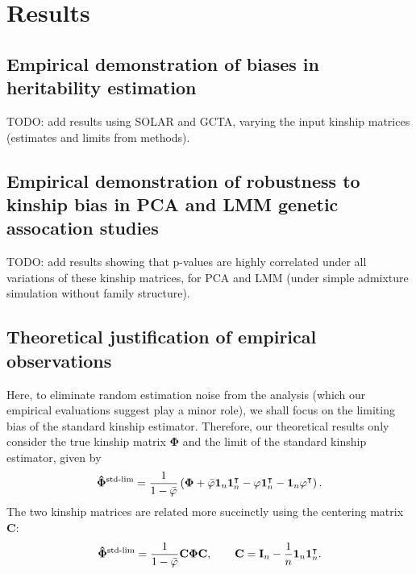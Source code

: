 \documentclass[11pt]{article}
\newcommand{\kinMat}{%
  \ensuremath{%
    \mathbf{\Phi}
  }%
  \xspace%
}%
\newcommand{\kinMatStdLim}{%
  \ensuremath{%
    \mathbf{\hat{\Phi}}^\text{std-lim}
  }%
  \xspace%
}%
\begin{document}
\section{Results}

\subsection{Empirical demonstration of biases in heritability estimation}

TODO: add results using SOLAR and GCTA, varying the input kinship matrices (estimates and limits from methods).

\subsection{Empirical demonstration of robustness to kinship bias in PCA and LMM genetic assocation studies}

TODO: add results showing that p-values are highly correlated under all variations of these kinship matrices, for PCA and LMM (under simple admixture simulation without family structure).

\subsection{Theoretical justification of empirical observations}

Here, to eliminate random estimation noise from the analysis (which our empirical evaluations suggest play a minor role), we shall focus on the limiting bias of the standard kinship estimator.
Therefore, our theoretical results only consider the true kinship matrix \kinMat and the limit of the standard kinship estimator, given by
$$
\kinMatStdLim
=
\frac{1}{1 - \bar{\varphi}}
\left(
  \kinMat
  + \bar{\varphi} \mathbf{1}_n \mathbf{1}_n^\intercal 
  - \mathbf{\varphi} \mathbf{1}_n^\intercal 
  - \mathbf{1}_n \mathbf{\varphi}^\intercal 
\right)
.
$$
The two kinship matrices are related more succinctly using the centering matrix $\mathbf{C}$:
$$
\kinMatStdLim
=
\frac{1}{1 - \bar{\varphi}}
\mathbf{C} \kinMat \mathbf{C}
, \quad\quad
\mathbf{C}
=
\mathbf{I}_n - \frac{1}{n} \mathbf{1}_n \mathbf{1}_n^\intercal
.
$$
\end{document}
